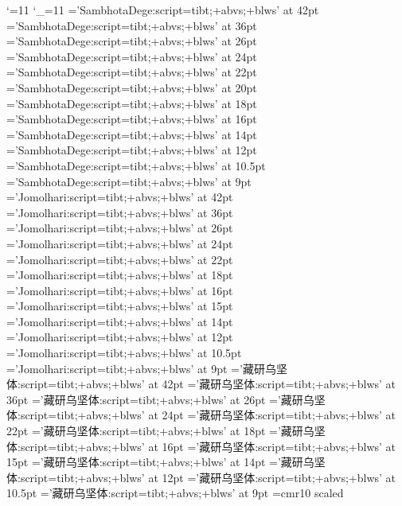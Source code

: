 ﻿
%
%
\def\TibeX{\hbox{Tib\kern-.1em \lower.5ex\hbox{E}\kern-.125em X}}
\catcode`\@=11  %
\catcode`\_=11  %
%
\font\SamThug='SambhotaDege:script=tibt;+abvs;+blws' at 42pt
\font\SamThugu='SambhotaDege:script=tibt;+abvs;+blws' at 36pt
\font\SamkCig='SambhotaDege:script=tibt;+abvs;+blws' at 26pt
\font\SamkCigChung='SambhotaDege:script=tibt;+abvs;+blws' at 24pt
\font\SamkNyis='SambhotaDege:script=tibt;+abvs;+blws' at 22pt
\font\SamkNyisChung='SambhotaDege:script=tibt;+abvs;+blws' at 20pt
\font\SamkSum='SambhotaDege:script=tibt;+abvs;+blws' at 18pt
\font\SamkSumChung='SambhotaDege:script=tibt;+abvs;+blws' at 16pt
\font\SambZhi='SambhotaDege:script=tibt;+abvs;+blws' at 14pt
\font\SambZhiChung='SambhotaDege:script=tibt;+abvs;+blws' at 12pt
\font\SamlNga='SambhotaDege:script=tibt;+abvs;+blws' at 10.5pt
\font\SamlNgaChung='SambhotaDege:script=tibt;+abvs;+blws' at 9pt
\let\Sam=\SamkNyisChung \let\sam=\Sam
\let\SamChe=\SamkNyis
\let\SamAu=\SamkSum
%
\font\JoThig='Jomolhari:script=tibt;+abvs;+blws' at 42pt
\font\JoThigu='Jomolhari:script=tibt;+abvs;+blws' at 36pt
\font\JokCig='Jomolhari:script=tibt;+abvs;+blws' at 26pt
\font\JokCigChung='Jomolhari:script=tibt;+abvs;+blws' at 24pt
\font\JokNyis='Jomolhari:script=tibt;+abvs;+blws' at 22pt
\font\JokNyisChung='Jomolhari:script=tibt;+abvs;+blws' at 18pt
\font\JokSum='Jomolhari:script=tibt;+abvs;+blws' at 16pt
\font\JokSumChung='Jomolhari:script=tibt;+abvs;+blws' at 15pt
\font\JobZhi='Jomolhari:script=tibt;+abvs;+blws' at 14pt
\font\JobZhiChung='Jomolhari:script=tibt;+abvs;+blws' at 12pt
\font\JolNga='Jomolhari:script=tibt;+abvs;+blws' at 10.5pt
\font\JolNgaChung='Jomolhari:script=tibt;+abvs;+blws' at 9pt
\let\Jo=\JokNyisChung \let\jo=\JokSum
\let\JoChe=\JokNyis
\let\JoAu=\JokSum
%
\font\ZhibThig='藏研乌坚体:script=tibt;+abvs;+blws' at 42pt
\font\ZhibThigu='藏研乌坚体:script=tibt;+abvs;+blws' at 36pt
\font\ZhibkCig='藏研乌坚体:script=tibt;+abvs;+blws' at 26pt
\font\ZhibkCigChung='藏研乌坚体:script=tibt;+abvs;+blws' at 24pt
\font\ZhibkNyis='藏研乌坚体:script=tibt;+abvs;+blws' at 22pt
\font\ZhibkNyisChung='藏研乌坚体:script=tibt;+abvs;+blws' at 18pt
\font\ZhibkSum='藏研乌坚体:script=tibt;+abvs;+blws' at 16pt
\font\ZhibkSumChung='藏研乌坚体:script=tibt;+abvs;+blws' at 15pt
\font\ZhibbZhi='藏研乌坚体:script=tibt;+abvs;+blws' at 14pt
\font\ZhibbZhiChung='藏研乌坚体:script=tibt;+abvs;+blws' at 12pt
\font\ZhiblNga='藏研乌坚体:script=tibt;+abvs;+blws' at 10.5pt
\font\ZhiblNgaChung='藏研乌坚体:script=tibt;+abvs;+blws' at 9pt
\let\Zhib=\ZhibkSum \let\zhib=\ZhibkSum
\let\ZhibChe=\ZhibkNyis \let\ZhibAu=\ZhibkSumChung
%
\font\bigtenrm=cmr10 scaled
\def\romanfittib#1{\bws\lower9pt\hbox{\bigtenrm #1}\bws}
\def\LetterSkip{\nobreak\hskip0em plus.015em minus.003em}
\def\WordSkip{\hskip0em plus.05em minus.05em}
\def\BackwordSkip{\hskip.07em plus.03em minus.03em}
\def\SentenceSkip{\hskip.6em plus.3em minus.3em}
\let\ss=\SentenceSkip
\let\ws=\WordSkip
\let\bws=\BackwordSkip
\let\nb=\nobreak
\let\ls=\LetterSkip

